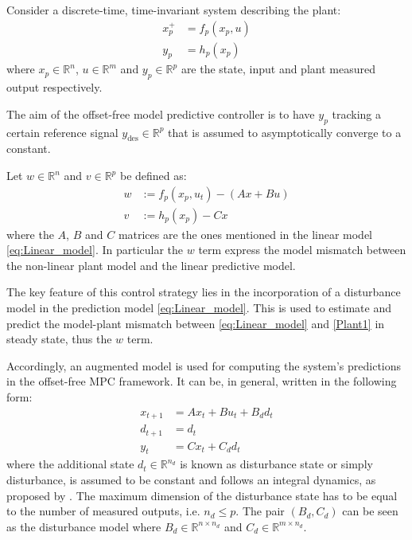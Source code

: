 \documentclass[a4paper,12pt,oneside]{book}
\begin{document}
\bigskip
Consider a discrete-time, time-invariant system describing the plant:
\begin{equation}
\begin{aligned}
    x_p^+ &= f_p (x_p, u) \\
    y_p &= h_p (x_p) 
\end{aligned}
\label{Plant1}
\end{equation}
where $x_p \in \mathbb{R}^n$, $u \in \mathbb{R}^m$ and $y_p \in \mathbb{R}^p$ are the state, input and plant measured output respectively. 

The aim of the offset-free model predictive controller is to have $y_p$ tracking a certain reference signal $y_{\text{des}} \in \mathbb{R}^p$ that is assumed to asymptotically converge to a constant.

\bigskip
Let $w \in \mathbb{R}^n$ and $v \in \mathbb{R}^p$ be defined as:
\begin{equation}
\begin{aligned}
    w & := f_p (x_p, u_t) - (A x + Bu) \\
    v & := h_p (x_p) - C x
\end{aligned}
\label{Plant_model_mismatch}
\end{equation}
where the $A$, $B$ and $C$ matrices are the ones mentioned in the linear model \ref{eq:Linear_model}. In particular the $w$ term express the model mismatch between the non-linear plant model and the linear predictive model.

\bigskip
The key feature of this control strategy lies in the incorporation of a disturbance model in the prediction model \ref{eq:Linear_model}.
This is used to estimate and predict the model-plant mismatch between \ref{eq:Linear_model} and \ref{Plant1} in steady state, thus the $w$ term. 

\bigskip
Accordingly, an augmented model is used for computing the system's predictions in the offset-free MPC framework. 
It can be, in general, written in the following form:
\begin{equation}
\begin{aligned}
    x_{t+1} &= A x_t + B u_t + B_d d_t \\
    d_{t+1} &= d_t \\
    y_t &= C x_t + C_d d_t
\end{aligned}
\label{Augmented_model}
\end{equation}
where the additional state $d_t \in \mathbb{R}^{n_d}$ is known as disturbance state or simply disturbance, is assumed to be constant and follows an integral dynamics, as proposed by \cite{pannocchia2003disturbance}. 
The maximum dimension of the disturbance state has to be equal to the number of measured outputs, i.e. $n_d \leq p$.
The pair $(B_d, C_d)$ can be seen as the disturbance model where $B_d \in \mathbb{R}^{n \times n_d}$ and $C_d \in \mathbb{R}^{m \times n_d}$.
\end{document}

